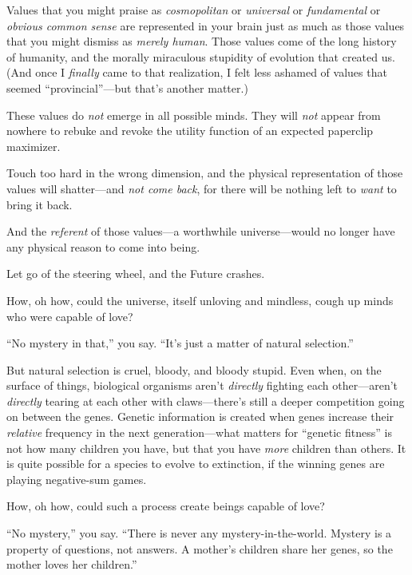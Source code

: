 {
 Values that you might praise as \textit{cosmopolitan} or
\textit{universal} or \textit{fundamental} or \textit{obvious common
sense} are represented in your brain just as much as those values that
you might dismiss as \textit{merely human}. Those values come of the
long history of humanity, and the morally miraculous stupidity of
evolution that created us. (And once I \textit{finally} came to that
realization, I felt less ashamed of values that seemed
``provincial''---but
that's another matter.)}

{
 These values do \textit{not} emerge in all possible minds. They
will \textit{not} appear from nowhere to rebuke and revoke the utility
function of an expected paperclip maximizer.}

{
 Touch too hard in the wrong dimension, and the physical
representation of those values will shatter---and \textit{not come
back}, for there will be nothing left to \textit{want} to bring it
back.}

{
 And the \textit{referent} of those values---a worthwhile
universe---would no longer have any physical reason to come into
being.}

{
 Let go of the steering wheel, and the Future crashes.}

\myendsectiontext


{
 How, oh how, could the universe, itself unloving and mindless,
cough up minds who were capable of love? }

{
 ``No mystery in that,'' you
say. ``It's just a matter of natural
selection.''}

{
 But natural selection is cruel, bloody, and bloody stupid. Even
when, on the surface of things, biological organisms
aren't \textit{directly} fighting each
other---aren't \textit{directly} tearing at each other
with claws---there's still a deeper competition going
on between the genes. Genetic information is created when genes
increase their \textit{relative} frequency in the next
generation---what matters for ``genetic
fitness'' is not how many children you have, but that
you have \textit{more} children than others. It is quite possible for a
species to evolve to extinction, if the winning genes are playing
negative-sum games.}

{
 How, oh how, could such a process create beings capable of love?}

{
 ``No mystery,'' you say.
``There is never any mystery-in-the-world. Mystery is
a property of questions, not answers. A mother's
children share her genes, so the mother loves her
children.''}

